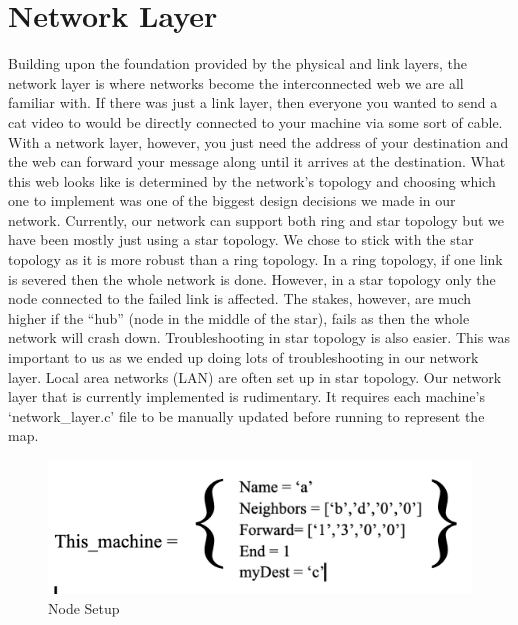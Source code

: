 \documentclass[10pt, letterpaper, twocolumn]{article}
\begin{document}
\section{Network Layer}
Building upon the foundation provided by the physical and link layers, the network layer is where networks become the interconnected web we are all familiar with. If there was just a link layer, then everyone you wanted to send a cat video to would be directly connected to your machine via some sort of cable. With a network layer, however, you just need the address of your destination and the web can forward your message along until it arrives at the destination. What this web looks like is determined by the network’s topology and choosing which one to implement was one of the biggest design decisions we made in our network. Currently, our network can support both ring and star topology but we have been mostly just using a star topology.
We chose to stick with the star topology as it is more robust than a ring topology. In a ring topology, if one link is severed then the whole network is done. However, in a star topology only the node connected to the failed link is affected. The stakes, however, are much higher if the “hub” (node in the middle of the star), fails as then the whole network will crash down. Troubleshooting in star topology is also easier. This was important to us as we ended up doing lots of troubleshooting in our network layer. Local area networks (LAN) are often set up in star topology. Our network layer that is currently implemented is rudimentary. It requires each machine’s ‘network\_layer.c’ file to be manually updated before running to represent the map. 
\begin{figure}[ht]
\centering
\includegraphics[scale = .4]{fig_3.png}
\caption{Node Setup}
\label{Network Toplogy}
\end{figure}
\end{document}
